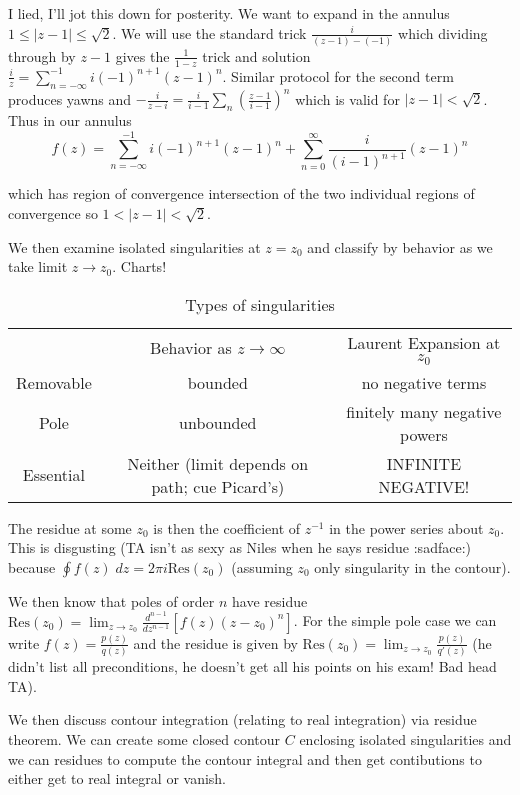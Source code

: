 \documentclass[10pt]{report}
\newcommand{\abs}[1]{\left|#1\right|}
\newcommand{\Res}[0]{\mathrm{Res} }
\begin{document}
I lied, I'll jot this down for posterity. We want to expand in the annulus $1 \leq \abs{z-1} \leq \sqrt{2}$. We will use the standard trick $\frac{i}{(z-1)-(-1)}$ which dividing through by $z-1$ gives the $\frac{1}{1-z}$ trick and solution $\frac{i}{z} = \sum_{n=-\infty}^{-1}i(-1)^{n+1}(z-1)^n$. Similar protocol for the second term produces yawns and $-\frac{i}{z-i} = \frac{i}{i-1}\sum_n \left( \frac{z-1}{i-1} \right)^n$ which is valid for $\abs{z-1} < \sqrt{2}$. Thus in our annulus
$$f(z) = \sum_{n=-\infty}^{-1}i(-1)^{n+1} (z-1)^n + \sum_{n=0}^\infty \frac{i}{(i-1)^{n+1}}(z-1)^n$$

which has region of convergence intersection of the two individual regions of convergence so $1 < \abs{z-1}<\sqrt{2}$. 

We then examine isolated singularities at $z=z_0$ and classify by behavior as we take limit $z \to z_0$. Charts!
\begin{table}
    \centering
    \begin{tabular}{c | c | c}
        & Behavior as $z \to \infty$ & Laurent Expansion at $z_0$\\
        Removable & bounded & no negative terms\\
        Pole & unbounded & finitely many negative powers\\
        Essential & Neither (limit depends on path; cue Picard's) & INFINITE NEGATIVE!
    \end{tabular}
    \caption{Types of singularities}
\end{table}

The residue at some $z_0$ is then the coefficient of $z^{-1}$ in the power series about $z_0$. This is disgusting (TA isn't as sexy as Niles when he says residue :sadface:) because $\oint f(z)\; dz = 2\pi i \Res(z_0)$ (assuming $z_0$ only singularity in the contour).

We then know that poles of order $n$ have residue $\Res(z_0) = \lim_{z \to z_0}\frac{d^{n-1}}{dz^{n-1}} \left[ f(z)(z-z_0)^n \right]$. For the simple pole case we can write $f(z) = \frac{p(z)}{q(z)}$ and the residue is given by $\Res(z_0) = \lim_{z \to z_0}\frac{p(z)}{q'(z)}$ (he didn't list all preconditions, he doesn't get all his points on his exam! Bad head TA).

We then discuss contour integration (relating to real integration) via residue theorem. We can create some closed contour $C$ enclosing isolated singularities and we can residues to compute the contour integral and then get contibutions to either get to real integral or vanish.
\end{document}
